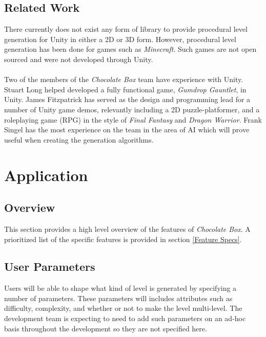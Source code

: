 \documentclass[pdftex,12pt,letter]{article}
\begin{document}
\subsection{Related Work}
There currently does not exist any form of library to provide procedural level generation for Unity in either a 2D or 3D form. However, procedural level generation has been done for games such as \textit{Minecraft}. Such games are not open sourced and were not developed through Unity. 
\\\\
Two of the members of the \textit{Chocolate Box} team have experience with Unity. Stuart Long helped developed a fully functional game, \textit{Gumdrop Gauntlet}, in Unity. James Fitzpatrick has served as the design and programming lead for a number of Unity game demos, relevantly including a 2D puzzle-platformer, and a roleplaying game (RPG) in the style of \textit{Final Fantasy} and \textit{Dragon Warrior}. Frank Singel has the most experience on the team in the area of AI which will prove useful when creating the generation algorithms.

\section{Application}
\subsection{Overview}
This section provides a high level overview of the features of \textit{Chocolate Box}. A prioritized list of the specific features is provided in section \ref{Feature Specs}.
\subsection{User Parameters}
Users will be able to shape what kind of level is generated by specifying a number of parameters. These parameters will includes attributes such as difficulty, complexity, and whether or not to make the level multi-level. The development team is expecting to need to add such parameters on an ad-hoc basis throughout the development so they are not specified here.
\end{document}
